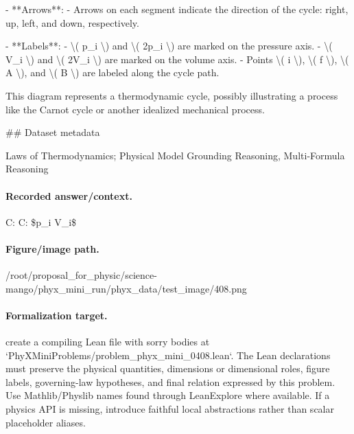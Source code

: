 - **Arrows**: 
  - Arrows on each segment indicate the direction of the cycle: right, up, left, and down, respectively.

- **Labels**:
  - \textbackslash{}( p\_i \textbackslash{}) and \textbackslash{}( 2p\_i \textbackslash{}) are marked on the pressure axis.
  - \textbackslash{}( V\_i \textbackslash{}) and \textbackslash{}( 2V\_i \textbackslash{}) are marked on the volume axis.
  - Points \textbackslash{}( i \textbackslash{}), \textbackslash{}( f \textbackslash{}), \textbackslash{}( A \textbackslash{}), and \textbackslash{}( B \textbackslash{}) are labeled along the cycle path.

This diagram represents a thermodynamic cycle, possibly illustrating a process like the Carnot cycle or another idealized mechanical process.

\#\# Dataset metadata

Laws of Thermodynamics; Physical Model Grounding Reasoning, Multi-Formula Reasoning

\paragraph{Recorded answer/context.}
C: C: \$p\_i V\_i\$

\paragraph{Figure/image path.}
/root/proposal\_for\_physic/science-mango/phyx\_mini\_run/phyx\_data/test\_image/408.png

\paragraph{Formalization target.}
create a compiling Lean file with sorry bodies at `PhyXMiniProblems/problem\_phyx\_mini\_0408.lean`. The Lean declarations must preserve the physical quantities, dimensions or dimensional roles, figure labels, governing-law hypotheses, and final relation expressed by this problem.
Use Mathlib/Physlib names found through LeanExplore where available. If a physics API is missing, introduce faithful local abstractions rather than scalar placeholder aliases.

